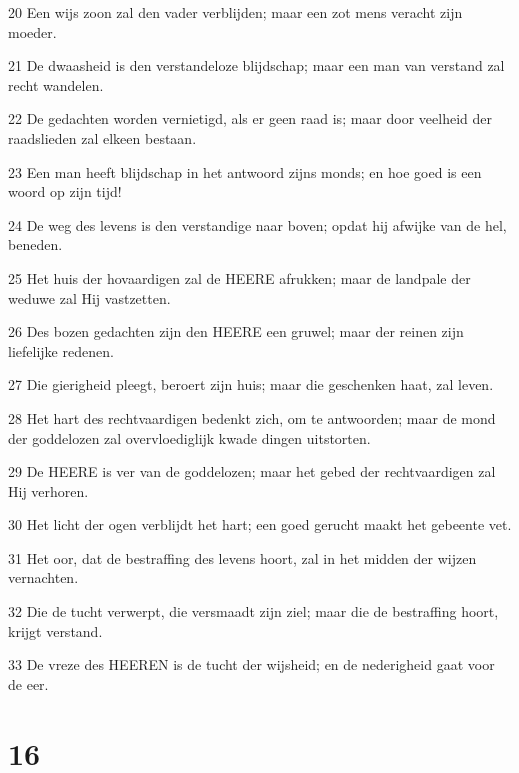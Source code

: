 \par 20 Een wijs zoon zal den vader verblijden; maar een zot mens veracht zijn moeder.
\par 21 De dwaasheid is den verstandeloze blijdschap; maar een man van verstand zal recht wandelen.
\par 22 De gedachten worden vernietigd, als er geen raad is; maar door veelheid der raadslieden zal elkeen bestaan.
\par 23 Een man heeft blijdschap in het antwoord zijns monds; en hoe goed is een woord op zijn tijd!
\par 24 De weg des levens is den verstandige naar boven; opdat hij afwijke van de hel, beneden.
\par 25 Het huis der hovaardigen zal de HEERE afrukken; maar de landpale der weduwe zal Hij vastzetten.
\par 26 Des bozen gedachten zijn den HEERE een gruwel; maar der reinen zijn liefelijke redenen.
\par 27 Die gierigheid pleegt, beroert zijn huis; maar die geschenken haat, zal leven.
\par 28 Het hart des rechtvaardigen bedenkt zich, om te antwoorden; maar de mond der goddelozen zal overvloediglijk kwade dingen uitstorten.
\par 29 De HEERE is ver van de goddelozen; maar het gebed der rechtvaardigen zal Hij verhoren.
\par 30 Het licht der ogen verblijdt het hart; een goed gerucht maakt het gebeente vet.
\par 31 Het oor, dat de bestraffing des levens hoort, zal in het midden der wijzen vernachten.
\par 32 Die de tucht verwerpt, die versmaadt zijn ziel; maar die de bestraffing hoort, krijgt verstand.
\par 33 De vreze des HEEREN is de tucht der wijsheid; en de nederigheid gaat voor de eer.

\chapter{16}

